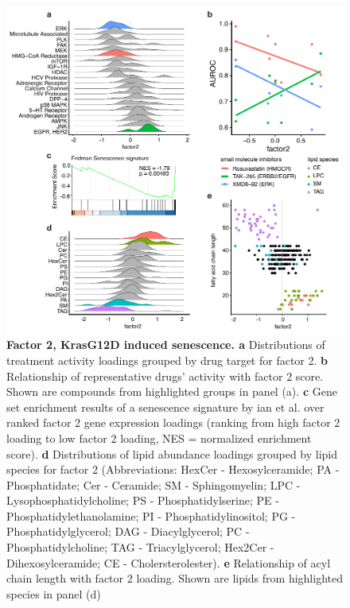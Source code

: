 \begin{flushleft}
\begin{figure}[h!]
\centering
\includegraphics[scale=0.75,
                keepaspectratio]{figures/adenomaprofiling/pdf/fig_3_1.pdf}
\caption{\textbf{Factor 2, KrasG12D induced senescence. a} Distributions of treatment activity loadings grouped by drug target for factor 2. \textbf{b} Relationship of representative drugs’ activity with factor 2 score. Shown are compounds from highlighted groups in panel (a). \textbf{c} Gene set enrichment results of a senescence signature by ian et al. over ranked factor 2 gene expression loadings (ranking from high factor 2 loading to low factor 2 loading, NES = normalized enrichment score). \textbf{d} Distributions of lipid abundance loadings grouped by lipid species for factor 2 (Abbreviations: HexCer - Hexosylceramide; PA - Phosphatidate; Cer - Ceramide; SM - Sphingomyelin; LPC - Lysophosphatidylcholine; PS - Phosphatidylserine; PE - Phosphatidylethanolamine; PI - Phosphatidylinositol; PG - Phosphatidylglycerol; DAG - Diacylglycerol; PC - Phosphatidylcholine; TAG - Triacylglycerol; Hex2Cer - Dihexosylceramide; CE - Cholersterolester). \textbf{e} Relationship of acyl chain length with factor 2 loading. Shown are lipids from highlighted species in panel (d)}
\label{fig_200}
\end{figure}


\end{flushleft}
